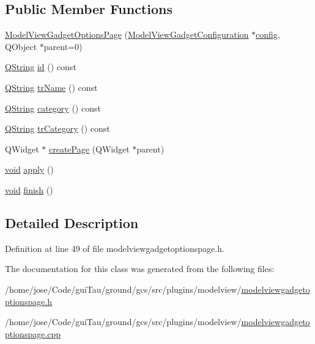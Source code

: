 \subsection*{Public Member Functions}
\begin{DoxyCompactItemize}
\item 
\hyperlink{group___model_view_plugin_ga86839ae520e5a8d7d38e0349ab8110db}{Model\-View\-Gadget\-Options\-Page} (\hyperlink{class_model_view_gadget_configuration}{Model\-View\-Gadget\-Configuration} $\ast$\hyperlink{deflate_8c_a4473b5227787415097004fd39f55185e}{config}, Q\-Object $\ast$parent=0)
\item 
\hyperlink{group___u_a_v_objects_plugin_gab9d252f49c333c94a72f97ce3105a32d}{Q\-String} \hyperlink{group___model_view_plugin_ga4ef97dfb27bc7bf0761a6ef8c9992461}{id} () const 
\item 
\hyperlink{group___u_a_v_objects_plugin_gab9d252f49c333c94a72f97ce3105a32d}{Q\-String} \hyperlink{group___model_view_plugin_ga957813f49ad4050f6d8fe39c8ddb8db9}{tr\-Name} () const 
\item 
\hyperlink{group___u_a_v_objects_plugin_gab9d252f49c333c94a72f97ce3105a32d}{Q\-String} \hyperlink{group___model_view_plugin_ga7ac23d7285b3e6b2541b45329d26d973}{category} () const 
\item 
\hyperlink{group___u_a_v_objects_plugin_gab9d252f49c333c94a72f97ce3105a32d}{Q\-String} \hyperlink{group___model_view_plugin_ga0026a37d0b02b743a513a6f79b88928e}{tr\-Category} () const 
\item 
Q\-Widget $\ast$ \hyperlink{group___model_view_plugin_ga5a42eda3ce28f2971be7b426347d588a}{create\-Page} (Q\-Widget $\ast$parent)
\item 
\hyperlink{group___u_a_v_objects_plugin_ga444cf2ff3f0ecbe028adce838d373f5c}{void} \hyperlink{group___model_view_plugin_ga77c3c23e38d3018c84f464c0ef5402e5}{apply} ()
\item 
\hyperlink{group___u_a_v_objects_plugin_ga444cf2ff3f0ecbe028adce838d373f5c}{void} \hyperlink{group___model_view_plugin_ga9ba47bc802df977b1f8cc5f1c8b70ca3}{finish} ()
\end{DoxyCompactItemize}


\subsection{Detailed Description}


Definition at line 49 of file modelviewgadgetoptionspage.\-h.



The documentation for this class was generated from the following files\-:\begin{DoxyCompactItemize}
\item 
/home/jose/\-Code/gui\-Tau/ground/gcs/src/plugins/modelview/\hyperlink{modelviewgadgetoptionspage_8h}{modelviewgadgetoptionspage.\-h}\item 
/home/jose/\-Code/gui\-Tau/ground/gcs/src/plugins/modelview/\hyperlink{modelviewgadgetoptionspage_8cpp}{modelviewgadgetoptionspage.\-cpp}\end{DoxyCompactItemize}
